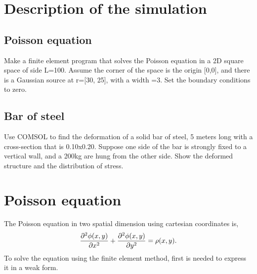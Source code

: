 \documentclass[main.tex]{subfiles}
\begin{document}
\section{Description of the simulation}

\subsection{Poisson equation}
Make a finite element program that solves the Poisson equation in a 2D square space of side L=100.  Assume the corner of the space is the origin [0,0], and there is a Gaussian source at r=[30, 25], with a width =3. Set the boundary conditions to zero.

\subsection{Bar of steel}
Use COMSOL to find the deformation of a solid bar of steel, 5 meters long with a cross-section that is 0.10x0.20. Suppose one side of the bar is strongly fixed to a vertical wall, and a 200kg are hung from the other side. Show the deformed structure and the distribution of stress. 

\section{Poisson equation}

The Poisson equation in two spatial dimension using cartesian coordinates is,
\begin{gather}
    \pdv[2]{\phi(x,y)}{x} + \pdv[2]{\phi(x,y)}{y} = \rho(x,y).
\end{gather}
To solve the equation using the finite element method, first is needed to express it in a weak form.
\end{document}
